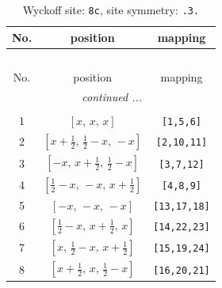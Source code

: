 \documentclass[fleqn,8pt]{jsarticle}
\begin{document}
\renewcommand{\arraystretch}{1.2}
\begin{longtable}{ccc}
\caption{Wyckoff site: {\tt 8c}, site symmetry: {\tt .3.}}
 \\
 \hline \hline
No. & position & mapping \\ \hline \endfirsthead

\multicolumn{2}{l}{\tablename\ \thetable{}} \\
 \hline \hline
No. & position & mapping \\ \hline \endhead

 \hline \hline
\multicolumn{2}{r}{\footnotesize\it continued ...} \\ \endfoot

 \hline \hline
\multicolumn{2}{r}{} \\ \endlastfoot

1 & $\left[ x,\, x,\, x \right]$ & {\tt [1,5,6]} \\ \hline
2 & $\left[ x + \frac{1}{2},\, \frac{1}{2} - x,\, - x \right]$ & {\tt [2,10,11]} \\ \hline
3 & $\left[ - x,\, x + \frac{1}{2},\, \frac{1}{2} - x \right]$ & {\tt [3,7,12]} \\ \hline
4 & $\left[ \frac{1}{2} - x,\, - x,\, x + \frac{1}{2} \right]$ & {\tt [4,8,9]} \\ \hline
5 & $\left[ - x,\, - x,\, - x \right]$ & {\tt [13,17,18]} \\ \hline
6 & $\left[ \frac{1}{2} - x,\, x + \frac{1}{2},\, x \right]$ & {\tt [14,22,23]} \\ \hline
7 & $\left[ x,\, \frac{1}{2} - x,\, x + \frac{1}{2} \right]$ & {\tt [15,19,24]} \\ \hline
8 & $\left[ x + \frac{1}{2},\, x,\, \frac{1}{2} - x \right]$ & {\tt [16,20,21]} \\
\end{longtable}
\renewcommand{\arraystretch}{1.2}
\end{document}
